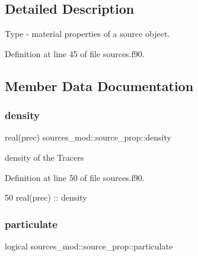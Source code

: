 \subsection{Detailed Description}
Type -\/ material properties of a source object. 

Definition at line 45 of file sources.\+f90.



\subsection{Member Data Documentation}
\mbox{\label{structsources__mod_1_1source__prop_ac569c18f02e33c5ca95f423bcb9fb30e}} 
\subsubsection{\texorpdfstring{density}{density}}
{\footnotesize\ttfamily real(prec) sources\+\_\+mod\+::source\+\_\+prop\+::density\hspace{0.3cm}{\ttfamily [private]}}



density of the Tracers 



Definition at line 50 of file sources.\+f90.


\begin{DoxyCode}
50         \textcolor{keywordtype}{real(prec)} :: density
\end{DoxyCode}
\mbox{\label{structsources__mod_1_1source__prop_af02d964cfaa712c12127327719794fde}} 
\subsubsection{\texorpdfstring{particulate}{particulate}}
{\footnotesize\ttfamily logical sources\+\_\+mod\+::source\+\_\+prop\+::particulate\hspace{0.3cm}{\ttfamily [private]}}



